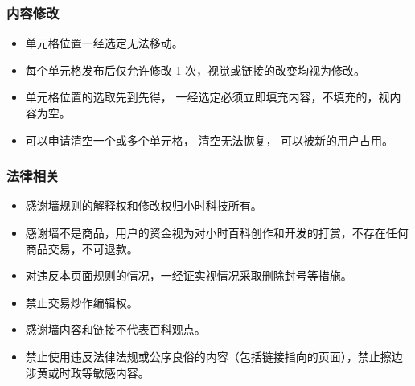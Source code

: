 \subsubsection{内容修改}
\begin{itemize}
\item 单元格位置一经选定无法移动。
\item 每个单元格发布后仅允许修改 1 次，视觉或链接的改变均视为修改。
\item 单元格位置的选取先到先得， 一经选定必须立即填充内容，不填充的，视内容为空。
\item 可以申请清空一个或多个单元格， 清空无法恢复， 可以被新的用户占用。
\end{itemize}

\subsubsection{法律相关}
\begin{itemize}
\item 感谢墙规则的解释权和修改权归小时科技所有。
\item 感谢墙不是商品，用户的资金视为对小时百科创作和开发的打赏，不存在任何商品交易，不可退款。
\item 对违反本页面规则的情况，一经证实视情况采取删除封号等措施。
\item 禁止交易炒作编辑权。
\item 感谢墙内容和链接不代表百科观点。
\item 禁止使用违反法律法规或公序良俗的内容（包括链接指向的页面），禁止擦边涉黄或时政等敏感内容。
\end{itemize}
